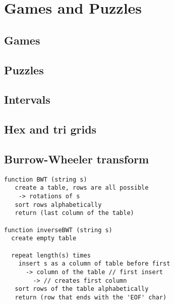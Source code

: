 
\chapter{Games and Puzzles}

\section{Games}
	
\section{Puzzles}

\section{Intervals}

\section{Hex and tri grids}

\section{Burrow-Wheeler transform}

\begin{verbatim}
function BWT (string s)
   create a table, rows are all possible
	-> rotations of s
   sort rows alphabetically
   return (last column of the table)
 
function inverseBWT (string s)
  create empty table 
       
  repeat length(s) times
    insert s as a column of table before first
      -> column of the table // first insert
		-> // creates first column
   sort rows of the table alphabetically
   return (row that ends with the 'EOF' char)
\end{verbatim}

